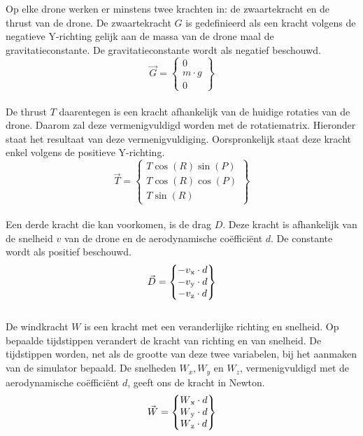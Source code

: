 \noindent
Op elke drone werken er minstens twee krachten in: de zwaartekracht en de thrust van de drone. De zwaartekracht \(G\) is gedefinieerd als een kracht volgens de negatieve Y-richting gelijk aan de massa van de drone maal de gravitatieconstante. De gravitatieconstante wordt als negatief beschouwd.
\begin{equation*}
\vec{G} = 
\begin{Bmatrix}
0 \\
m \cdot g \\
0
\end{Bmatrix} \label{zwaartekracht}
\end{equation*}
\\
De thrust \(T\) daarentegen is een kracht afhankelijk van de huidige rotaties van de drone. Daarom zal deze vermenigvuldigd worden met de rotatiematrix. Hieronder staat het resultaat van deze vermenigvuldiging. Oorspronkelijk staat deze kracht enkel volgens de positieve Y-richting. 
\\
\begin{equation*}
\vec{T} =
\begin{Bmatrix}
T \cos(R) \sin(P) \\
T \cos(R)\cos(P)\\
T \sin(R)
\end{Bmatrix} \label{thrustkracht}
\end{equation*}
\\
Een derde kracht die kan voorkomen, is de drag \(D\). Deze kracht is afhankelijk van de snelheid \(v\) van de drone en de aerodynamische coëfficiënt \(d\). De constante wordt als positief beschouwd.
\begin{equation*}
\vec{D} =
\begin{Bmatrix}
-v\textsubscript{x} \cdot d \\
-v\textsubscript{y} \cdot d \\
-v\textsubscript{z} \cdot d 
\end{Bmatrix} \label{dragkracht}
\end{equation*}
\\
De windkracht \(W\) is een kracht met een veranderlijke richting en snelheid. Op bepaalde tijdstippen verandert de kracht van richting en  van snelheid. De tijdstippen worden, net als de grootte van deze twee variabelen, bij het aanmaken van de simulator bepaald. De snelheden \(W_x, W_y\) en \(W_z\), vermenigvuldigd met de aerodynamische coëfficiënt \(d\), geeft ons de kracht in Newton. 
\begin{equation*}
\vec{W} = 
\begin{Bmatrix}
W\textsubscript{x} \cdot d \\
W\textsubscript{y} \cdot d \\
W\textsubscript{z} \cdot d 
\end{Bmatrix} \label{windkracht}
\end{equation*}
